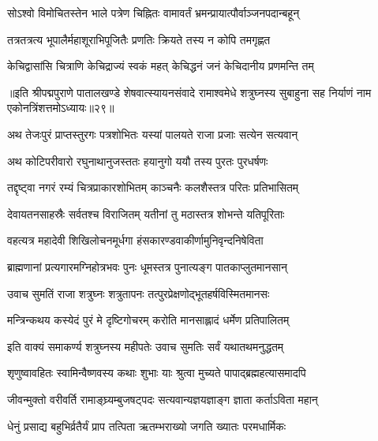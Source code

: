 \twolineshloka
{सोऽश्वो विमोचितस्तेन भाले पत्रेण चिह्नितः}
{वामावर्तं भ्रमन्प्रायात्पौर्वाञ्जनपदान्बहून्}%

\twolineshloka
{तत्रतत्रत्य भूपालैर्महाशूराभिपूजितैः}
{प्रणतिः क्रियते तस्य न कोपि तमगृह्णत}%

\twolineshloka
{केचिद्वासांसि चित्राणि केचिद्राज्यं स्वकं महत्}
{केचिद्धनं जनं केचिदानीय प्रणमन्ति तम्}%

॥इति श्रीपद्मपुराणे पातालखण्डे शेषवात्स्यायनसंवादे रामाश्वमेधे शत्रुघ्नस्य सुबाहुना सह निर्याणं नाम एकोनत्रिंशत्तमोऽध्यायः॥२९॥



\twolineshloka
{अथ तेजःपुरं प्राप्तस्तुरगः पत्रशोभितः}
{यस्यां पालयते राजा प्रजाः सत्येन सत्यवान्}%

\twolineshloka
{अथ कोटिपरीवारो रघुनाथानुजस्ततः}
{हयानुगो ययौ तस्य पुरतः पुरधर्षणः}%

\twolineshloka
{तद्दृष्ट्वा नगरं रम्यं चित्रप्राकारशोभितम्}
{काञ्चनैः कलशैस्तत्र परितः प्रतिभासितम्}%

\twolineshloka
{देवायतनसाहस्रैः सर्वतश्च विराजितम्}
{यतीनां तु मठास्तत्र शोभन्ते यतिपूरिताः}%

\twolineshloka
{वहत्यत्र महादेवी शिखिलोचनमूर्धगा}
{हंसकारण्डवाकीर्णामुनिवृन्दनिषेविता}%

\twolineshloka
{ब्राह्मणानां प्रत्यगारमग्निहोत्रभवः पुनः}
{धूमस्तत्र पुनात्यङ्ग पातकाप्लुतमानसान्}%

\twolineshloka
{उवाच सुमतिं राजा शत्रुघ्नः शत्रुतापनः}
{तत्पुरप्रेक्षणोद्भूतहर्षविस्मितमानसः}%


\twolineshloka
{मन्त्रिन्कथय कस्येदं पुरं मे दृष्टिगोचरम्}
{करोति मानसाह्लादं धर्मेण प्रतिपालितम्}%


\twolineshloka
{इति वाक्यं समाकर्ण्य शत्रुघ्नस्य महीपतेः}
{उवाच सुमतिः सर्वं यथातथमनुद्धतम्}%


\twolineshloka
{शृणुष्वावहितः स्वामिन्वैष्णवस्य कथाः शुभाः}
{याः श्रुत्वा मुच्यते पापाद्ब्रह्महत्यासमादपि}%

\twolineshloka
{जीवन्मुक्तो वरीवर्ति रामाङ्घ्र्यम्बुजषट्पदः}
{सत्यवान्यज्ञयज्ञाङ्ग ज्ञाता कर्ताऽविता महान्}%

\twolineshloka
{धेनुं प्रसाद्य बहुभिर्व्रतैर्यं प्राप तत्पिता}
{ऋतम्भराख्यो जगति ख्यातः परमधार्मिकः}%

